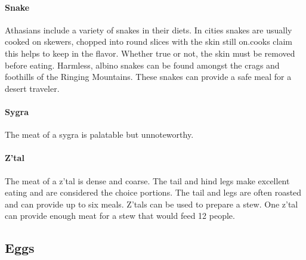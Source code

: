\begin{multicols}{2}
\paragraph{Snake} Athasians include a variety of snakes in their diets. In cities snakes are usually cooked on skewers, chopped into round slices with the skin still on.cooks claim this helps to keep in the flavor. Whether true or not, the skin must be removed before eating. Harmless, albino snakes can be found amongst the crags and foothills of the Ringing Mountains. These snakes can provide a safe meal for a desert traveler.\\
\paragraph{Sygra} The meat of a sygra is palatable but unnoteworthy.\\
\paragraph{Z'tal} The meat of a z'tal is dense and coarse.  The tail and hind legs make excellent eating and are considered the choice portions. The tail and legs are often roasted and can provide up to six meals. Z'tals can be used to prepare a stew. One z'tal can provide enough meat for a stew that would feed 12 people.\\

\end{multicols}
\hrulefill

\subsection{Eggs}


